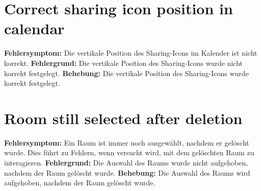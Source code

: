 \section{Correct sharing icon position in calendar}
\textbf{Fehlersymptom:} Die vertikale Position des Sharing-Icons im Kalender ist nicht korrekt.
\textbf{Fehlergrund:} Die vertikale Position des Sharing-Icons wurde nicht korrekt festgelegt.
\textbf{Behebung:} Die vertikale Position des Sharing-Icons wurde korrekt festgelegt.

\section{Room still selected after deletion}
\textbf{Fehlersymptom:} Ein Raum ist immer noch ausgewählt, nachdem er gelöscht wurde. Dies führt zu Fehlern, wenn versucht wird, mit dem gelöschten Raum zu interagieren.
\textbf{Fehlergrund:} Die Auswahl des Raums wurde nicht aufgehoben, nachdem der Raum gelöscht wurde.
\textbf{Behebung:} Die Auswahl des Raums wird aufgehoben, nachdem der Raum gelöscht wurde.

